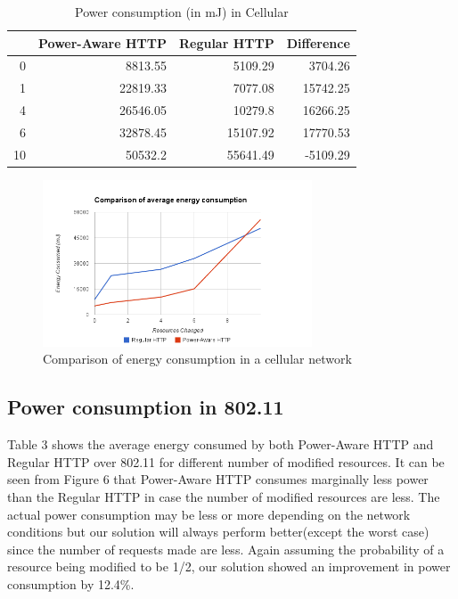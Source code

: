 \documentclass{sigplanconf}
\begin{document}
\begin{table}[htbp]
\centering
\caption{Power consumption (in mJ) in Cellular}
\begin{tabular}{|r|r|r|r|}
\hline
\multicolumn{1}{|l|}{} & \multicolumn{1}{l|}{Power-Aware HTTP} & \multicolumn{1}{l|}{Regular HTTP} & \multicolumn{1}{l|}{Difference} \\ \hline
0 & 8813.55 & 5109.29 & 3704.26 \\ \hline
1 & 22819.33 & 7077.08 & 15742.25 \\ \hline
4 & 26546.05 & 10279.8 & 16266.25 \\ \hline
6 & 32878.45 & 15107.92 & 17770.53 \\ \hline
10 & 50532.2 & 55641.49 & -5109.29 \\ \hline
\end{tabular}
\label{}
\end{table}

\begin{figure}[ht!]
\centering
\includegraphics[width=80mm]{avg_energy_cell.png}
\caption{Comparison of energy consumption in a cellular network}
\label{fig:sp_gd_mnist}
\end{figure}

\subsection{Power consumption in 802.11}
Table 3 shows the average energy consumed by both Power-Aware HTTP and Regular HTTP over 802.11 for different number of modified resources. It can be seen from Figure 6 that Power-Aware HTTP consumes marginally less power than the Regular HTTP in case the number of modified resources are less. The actual power consumption may be less or more depending on the network conditions but our solution will always perform better(except the worst case) since the number of requests made are less. Again assuming the probability of a resource being modified to be 1/2, our solution showed an improvement in power consumption by 12.4\%.
\end{document}
